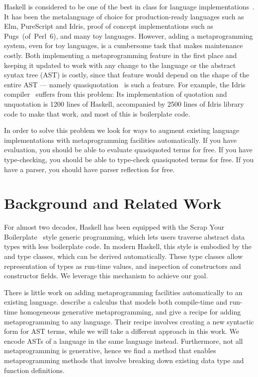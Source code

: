 



Haskell is considered to be one of the best in class for language implementations~\cite{sotu}.
It has been the metalanguage of choice for production-ready languages such as Elm, PureScript and Idris, proof of concept implementations such as \mbox{Pugs (of Perl 6)}, and many toy languages.
However, adding a metaprogramming system, even for toy languages, is a cumbersome task that makes maintenance costly.
Both implementing a metaprogramming feature in the first place and keeping it updated to work with any change to the language or the abstract syntax tree (AST) is costly, since that feature would depend on the shape of the entire AST --- namely quasiquotation~\cite{idrisQuotation} is such a feature.
For example, the Idris compiler~\cite{idris} suffers from this problem: Its implementation of quotation and unquotation is 1200 lines of Haskell, accompanied by 2500 lines of Idris library code to make that work, and most of this is boilerplate code.

In order to solve this problem we look for ways to augment existing language implementations with metaprogramming facilities automatically.
If you have evaluation, you should be able to evaluate quasiquoted terms for free.
If you have type-checking, you should be able to type-check quasiquoted terms for free.
If you have a parser, you should have parser reflection for free.

\section{Background and Related Work}

For almost two decades, Haskell has been equipped with the Scrap Your
Boilerplate~\cite{syb,sybc} style generic programming, which lets users traverse
abstract data types with less boilerplate code.
In modern Haskell, this style is embodied by the  and 
type classes, which can be derived automatically.
These type classes allow representation of types as run-time values, and inspection of constructors and constructor fields.
We leverage this mechanism to achieve our goal.

There is little work on adding metaprogramming facilities automatically to an existing language.
\citet{hgmp} describe a calculus that models both compile-time and run-time homogeneous generative metaprogramming, and give a recipe for adding metaprogramming to any language.
Their recipe involves creating a new syntactic form for AST terms, while we
will take a different approach in this work.
We encode ASTs of a language in the same language instead.
Furthermore, not all metaprogramming is generative, hence we find a method that enables metaprogramming methods that involve breaking down existing data type and function definitions.

